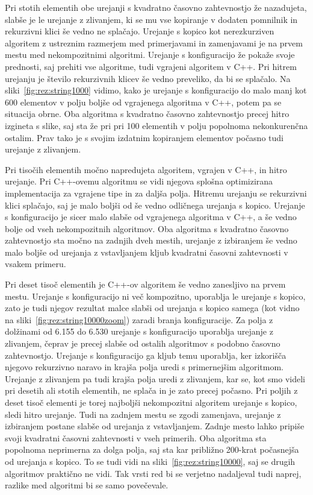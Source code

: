\documentclass[a4paper,oneside,12pt]{article}
\begin{document}
Pri stotih elementih obe urejanji s kvadratno časovno zahtevnostjo že nazadujeta, slabše je le urejanje z zlivanjem,
ki se mu vse kopiranje v dodaten pomnilnik in rekurzivni klici 
še vedno ne splačajo. Urejanje s kopico kot nerezkurziven algoritem
z ustreznim razmerjem med primerjavami in zamenjavami je na prvem mestu med nekompozitnimi algoritmi.
Urejanje s konfiguracijo že pokaže svoje prednosti, saj prehiti vse algoritme, tudi vgrajeni 
algoritem v C++. Pri hitrem urejanju je število rekurzivnih klicev še vedno preveliko, da bi se splačalo.
Na sliki~\ref{fig:rez:string1000} vidimo, kako je urejanje s konfiguracijo do
malo manj kot 600 elementov v polju boljše od vgrajenega algoritma v C++, potem
pa se situacija obrne. Oba algoritma s kvadratno časovno zahtevnostjo precej
hitro izgineta s slike, saj sta že pri pri 100 elementih v polju popolnoma
nekonkurenčna ostalim. Prav tako je s svojim izdatnim kopiranjem elementov
počasno tudi urejanje z zlivanjem.

Pri tisočih elementih močno napredujeta algoritem, vgrajen v C++, in hitro urejanje. Pri \mbox{C++-ovemu} algoritmu
se vidi njegova splošna optimizirana implementacija za vgrajene tipe in za daljša polja. Hitremu urejanju se 
rekurzivni klici splačajo, saj je malo boljši od še vedno odličnega urejanja s kopico. Urejanje s konfiguracijo 
je sicer malo slabše od vgrajenega algoritma v C++, a še vedno bolje od vseh nekompozitnih algoritmov.
Oba algoritma s kvadratno časovno zahtevnostjo sta močno na zadnjih dveh mestih, urejanje z izbiranjem 
še vedno malo boljše od urejanja z vstavljanjem kljub kvadratni časovni zahtevnosti v vsakem primeru.

Pri deset tisoč elementih je \mbox{C++-ov} algoritem še vedno zanesljivo na prvem mestu. Urejanje s 
konfiguracijo ni več kompozitno, uporablja le urejanje s kopico, zato je tudi
njegov rezultat malce slabši od urejanja s kopico samega (kot vidno na
sliki~\ref{fig:rez:string10000zoom}) zaradi branja
konfiguracije. Za polja z dolžinami od 6.155 do 6.530 urejanje s konfiguracijo uporablja
urejanje z zlivanjem, čeprav je precej slabše od ostalih algoritmov s podobno časovno zahtevnostjo. Urejanje s
konfiguracijo ga kljub temu uporablja, ker izkorišča njegovo rekurzivno naravo in krajša polja uredi s
primernejšim algoritmom. Urejanje z zlivanjem pa tudi krajša polja uredi z zlivanjem, kar se, kot smo 
videli pri desetih ali stotih elementih, ne splača in je zato precej počasno.
Pri poljih z deset tisoč elementi je torej najboljši nekompozitni algoritem 
urejanje s kopico, sledi hitro urejanje. Tudi na zadnjem mestu se zgodi zamenjava, urejanje z izbiranjem
postane slabše od
urejanja z vstavljanjem.  Zadnje mesto lahko pripiše svoji kvadratni časovni
zahtevnosti v vseh primerih. Oba algoritma sta popolnoma neprimerna za dolga polja,
saj sta kar približno 200-krat počasnejša od urejanja s kopico. To se tudi vidi na
sliki~\ref{fig:rez:string10000}, saj se drugih algoritmov praktično ne vidi.
Tak vrsti red bi se verjetno nadaljeval tudi naprej, razlike med algoritmi bi se
samo povečevale.
\end{document}
